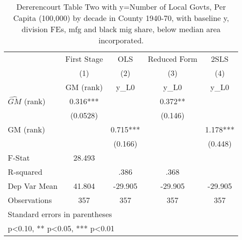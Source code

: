 \begin{table}[htbp]\centering
\def\sym#1{\ifmmode^{#1}\else\(^{#1}\)\fi}
\caption{Dererencourt Table Two with y=Number of Local Govts, Per Capita (100,000) by decade in County 1940-70, with baseline y, division FEs, mfg and black mig share, below median area incorporated.}
\begin{tabular}{l*{4}{c}}
\toprule
                    & First Stage   &         OLS   &Reduced Form   &        2SLS   \\
                    &\multicolumn{1}{c}{(1)}&\multicolumn{1}{c}{(2)}&\multicolumn{1}{c}{(3)}&\multicolumn{1}{c}{(4)}\\
                    &\multicolumn{1}{c}{GM  (rank)}&\multicolumn{1}{c}{y\_L0}&\multicolumn{1}{c}{y\_L0}&\multicolumn{1}{c}{y\_L0}\\
\midrule
$\hat{GM}$ (rank)   &       0.316***&               &       0.372** &               \\
                    &    (0.0528)   &               &     (0.146)   &               \\
\addlinespace
GM  (rank)          &               &       0.715***&               &       1.178***\\
                    &               &     (0.166)   &               &     (0.448)   \\
\midrule
F-Stat              &      28.493   &               &               &               \\
R-squared           &               &        .386   &        .368   &               \\
Dep Var Mean        &      41.804   &     -29.905   &     -29.905   &     -29.905   \\
Observations        &         357   &         357   &         357   &         357   \\
\bottomrule
\multicolumn{5}{l}{\footnotesize Standard errors in parentheses}\\
\multicolumn{5}{l}{\footnotesize * p<0.10, ** p<0.05, *** p<0.01}\\
\end{tabular}
\end{table}
